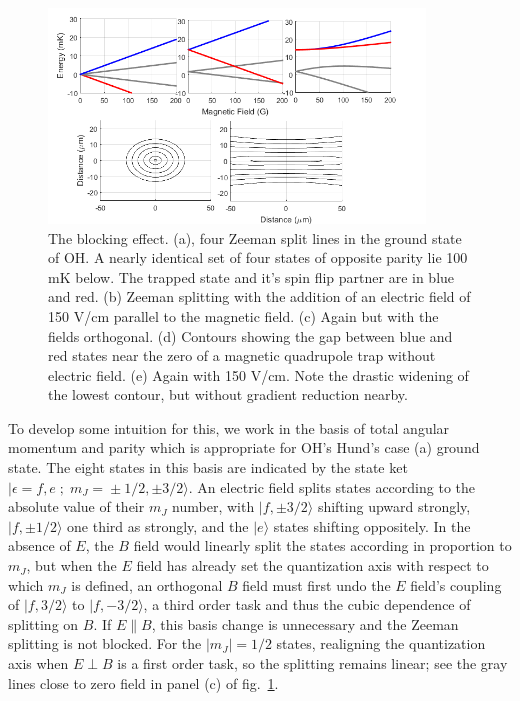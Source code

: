 \documentclass[%
 reprint,
 amsmath,amssymb,
 aps,
prl,
]{revtex4-1}
\begin{document}
\begin{figure}
\includegraphics[width=100mm]{blocking.png}%
\caption{
The blocking effect. (a), four Zeeman split lines in the ground state of OH. A nearly identical set of four states of opposite parity lie 100 mK below. The trapped state and it's spin flip partner are in blue and red. (b) Zeeman splitting with the addition of an electric field of 150 V/cm parallel to the magnetic field. (c) Again but with the fields orthogonal. (d) Contours showing the gap between blue and red states near the zero of a magnetic quadrupole trap without electric field. (e) Again with 150 V/cm. Note the drastic widening of the lowest contour, but without gradient reduction nearby.
\label{fig:blocking}}
\end{figure}

To develop some intuition for this, we work in the basis of total angular momentum and parity which is appropriate for OH's Hund's case (a) ground state. The eight states in this basis are indicated by the state ket $|\epsilon\!=\!f,e\;;\;m_J\!=\!\pm1/2,\pm3/2\rangle$. An electric field splits states according to the absolute value of their $m_J$ number, with $|f,\pm3/2\rangle$ shifting upward strongly, $|f,\pm1/2\rangle$ one third as strongly, and the $|e\rangle$ states shifting oppositely. In the absence of $E$, the $B$ field would linearly split the states according in proportion to $m_J$, but when the $E$ field has already set the quantization axis with respect to which $m_J$ is defined, an orthogonal $B$ field must first undo the $E$ field's coupling of $|f,3/2\rangle$ to $|f,-3/2\rangle$, a third order task and thus the cubic dependence of splitting on $B$. If $E\parallel B$, this basis change is unnecessary and the Zeeman splitting is not blocked. For the $|m_J|=1/2$ states, realigning the quantization axis when $E\!\perp\! B$ is a first order task, so the splitting remains linear; see the gray lines close to zero field in panel (c) of fig.~\ref{fig:blocking}. 
\end{document}
